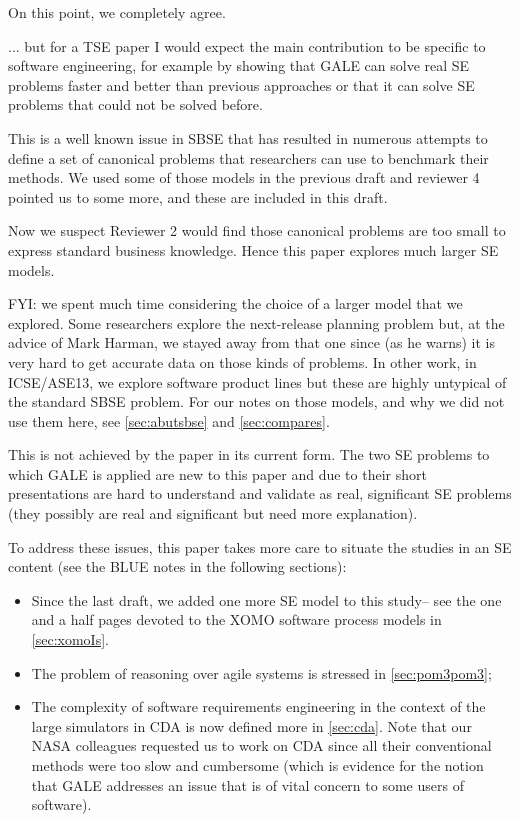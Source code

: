 \documentclass[10pt,journal,compsoc]{IEEEtran}
\newcommand{\bi}{\begin{itemize}}
\newcommand{\ei}{\end{itemize}}
\newcommand{\tion}[1]{\textsection\ref{sec:#1}}
\newenvironment{changed}{\par\color{MyDarkBlue}}{\par}
\begin{document}
\begin{changed}
On this point, we completely agree.
\end{changed}

... but for a TSE paper I
would expect the main contribution to be specific to
software engineering, for example by showing that
GALE can solve real SE problems faster and better
than previous approaches or that it can solve SE
problems that could not be solved before.
\begin{changed}

This is a
well known issue in SBSE that has resulted in
numerous attempts to define a set of canonical
problems that researchers can use to benchmark their
methods. We used some of those models in the previous draft
and reviewer 4 pointed us to some more, and these are
included in this draft.

Now we suspect Reviewer 2 would find those
canonical problems are too small to express
standard business knowledge. Hence this paper explores much
larger SE models.

FYI: we spent much time considering the choice of a larger
model that we explored.
Some researchers explore the
next-release planning problem but, at the advice of
Mark Harman, we stayed away from that one since (as
he warns) it is very hard to get accurate data on
those kinds of problems. 
In other work, in
ICSE/ASE13, we explore software product lines but these are highly untypical
of the standard SBSE problem.
For our notes on those models, and why we did not
use them here, see  \tion{abutsbse} 
and
\tion{compares}.

\end{changed}

 This is not achieved by the paper in its current
 form. The two SE problems to which GALE is applied
 are new to this paper and due to their short
 presentations are hard to understand and validate
 as real, significant SE problems (they possibly are
 real and significant but need more explanation). 

\begin{changed}
To address these issues, this paper takes more care
to situate the studies in an SE content (see the BLUE
notes in the following sections):
\bi
\item
Since the last draft, we added one
more SE model to this study-- see the one and a half
pages devoted to the XOMO software process models in \tion{xomoIs}.
\item
The problem of reasoning over agile systems is stressed in \tion{pom3pom3};
\item
The complexity of software requirements engineering in the context
of the large simulators in CDA is now defined more in \tion{cda}.
Note that our NASA colleagues requested us to work on CDA
since all their conventional methods were too slow and cumbersome (which is
evidence for the notion that GALE addresses an issue that is of
vital concern to some users of software).
\ei
\end{changed}
\end{document}
